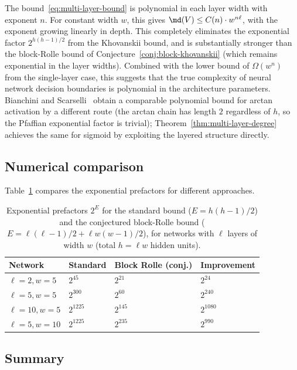 \begin{remark}
The bound~\eqref{eq:multi-layer-bound} is polynomial in each layer width with exponent $n$. For constant width $w$, this gives $\md(V) \leq C(n)\cdot w^{n\ell}$, with the exponent growing linearly in depth. This completely eliminates the exponential factor $2^{h(h-1)/2}$ from the Khovanskii bound, and is substantially stronger than the block-Rolle bound of Conjecture~\ref{conj:block-khovanskii} (which remains exponential in the layer widths). Combined with the lower bound of $\Omega(w^n)$ from the single-layer case, this suggests that the true complexity of neural network decision boundaries is polynomial in the architecture parameters. Bianchini and Scarselli~\cite{bianchini2014complexity} obtain a comparable polynomial bound for arctan activation by a different route (the arctan chain has length $2$ regardless of $h$, so the Pfaffian exponential factor is trivial); Theorem~\ref{thm:multi-layer-degree} achieves the same for sigmoid by exploiting the layered structure directly.
\end{remark}

\subsection{Numerical comparison}

Table~\ref{tab:layered-bounds} compares the exponential prefactors for different approaches.

\begin{table}[h!]
  \centering
  \begin{tabular}{llll}
    \toprule
    Network & Standard & Block Rolle (conj.) & Improvement \\
    \midrule
    $\ell=2, w=5$ & $2^{45}$ & $2^{21}$ & $2^{24}$ \\
    $\ell=5, w=5$ & $2^{300}$ & $2^{60}$ & $2^{240}$ \\
    $\ell=10, w=5$ & $2^{1225}$ & $2^{145}$ & $2^{1080}$ \\
    $\ell=5, w=10$ & $2^{1225}$ & $2^{235}$ & $2^{990}$ \\
    \bottomrule
  \end{tabular}
  \caption{Exponential prefactors $2^E$ for the standard bound ($E = h(h-1)/2$) and the conjectured block-Rolle bound ($E = \ell(\ell-1)/2 + \ell w(w-1)/2$), for networks with $\ell$ layers of width $w$ (total $h = \ell w$ hidden units).}
  \label{tab:layered-bounds}
\end{table}

\subsection{Summary}

